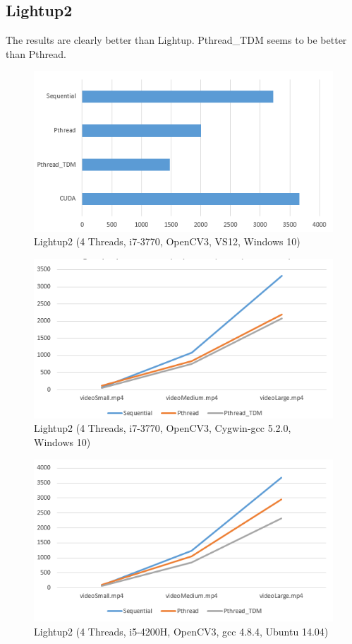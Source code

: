 \documentclass{acm_proc_article-sp}
\begin{document}
\subsection{Lightup2}
The results are clearly better than Lightup. Pthread\_TDM seems to be better than Pthread.
\begin{figure}[H]
  \includegraphics[width=\linewidth,natwidth=526,natheight=282]{lightup2.png}
  \caption{Lightup2 (4 Threads, i7-3770, OpenCV3, VS12, Windows 10)}
  \label{fig:lightup2}
\end{figure}
\begin{figure}[H]
  \includegraphics[width=\linewidth,natwidth=535,natheight=285]{lightup2_sml.png}
  \caption{Lightup2 (4 Threads, i7-3770, OpenCV3, Cygwin-gcc 5.2.0, Windows 10)}
  \label{fig:lightup2_sml}
\end{figure}
\begin{figure}[H]
  \includegraphics[width=\linewidth,natwidth=536,natheight=290]{lightup2_ubuntu.png}
  \caption{Lightup2 (4 Threads, i5-4200H, OpenCV3, gcc 4.8.4, Ubuntu 14.04)}
  \label{fig:lightup2_ubuntu}
\end{figure}
\end{document}
